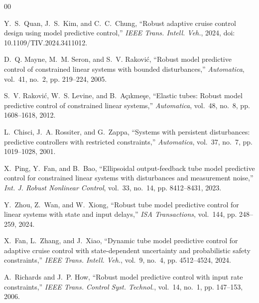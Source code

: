 \documentclass[journal]{IEEEtran}
\begin{document}
\begin{thebibliography}{00}

Y.~S.~Quan, J.~S.~Kim, and C.~C.~Chung, ``Robust adaptive cruise control design using model predictive control,'' \emph{IEEE Trans. Intell. Veh.}, 2024, doi: 10.1109/TIV.2024.3411012.

D.~Q. Mayne, M.~M. Seron, and S.~V. Rakovi{\'c}, ``Robust model predictive control of constrained linear systems with bounded disturbances,'' \emph{Automatica}, vol.~41, no.~2, pp. 219--224, 2005.

S.~V. Rakovi{\'c}, W.~S. Levine, and B.~A{\c{c}}{\i}kme{\c{s}}e, ``Elastic tubes: Robust model predictive control of constrained linear systems,'' \emph{Automatica}, vol.~48, no.~8, pp. 1608--1618, 2012.

L.~Chisci, J.~A. Rossiter, and G.~Zappa, ``Systems with persistent disturbances: predictive controllers with restricted constraints,'' \emph{Automatica}, vol.~37, no.~7, pp. 1019--1028, 2001.

X.~Ping, Y.~Fan, and B.~Bao, ``Ellipsoidal output-feedback tube model predictive control for constrained linear systems with disturbances and measurement noise,'' \emph{Int. J. Robust Nonlinear Control}, vol.~33, no.~14, pp. 8412--8431, 2023.

Y.~Zhou, Z.~Wan, and W.~Xiong, ``Robust tube model predictive control for linear systems with state and input delays,'' \emph{ISA Transactions}, vol.~144, pp. 248--259, 2024.

X.~Fan, L.~Zhang, and J.~Xiao, ``Dynamic tube model predictive control for adaptive cruise control with state-dependent uncertainty and probabilistic safety constraints,'' \emph{IEEE Trans. Intell. Veh.}, vol.~9, no.~4, pp. 4512--4524, 2024.

A.~Richards and J.~P. How, ``Robust model predictive control with input rate constraints,'' \emph{IEEE Trans. Control Syst. Technol.}, vol.~14, no.~1, pp. 147--153, 2006.

\end{thebibliography}
\end{document}
